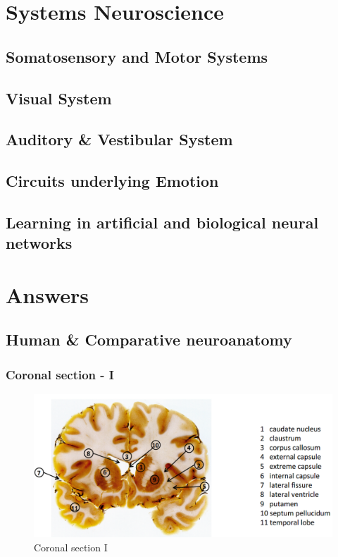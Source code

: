 \documentclass[12pt,article,oneside,a4paper]{memoir}
\begin{document}
\section{Systems Neuroscience}
\subsection{Somatosensory and Motor Systems}
\subsection{Visual System}
\subsection{Auditory \& Vestibular System}
\subsection{Circuits underlying Emotion}
\subsection{Learning in artificial and biological neural networks}

\section{Answers}
\subsection{Human \& Comparative neuroanatomy}

\subsubsection{Coronal section - I}
\begin{figure}[H]
	\centering
  	\includegraphics[width=\linewidth]{imgs/coronal-section-I-answer.png}
	\caption{Coronal section I}
  	\label{fig:coronalSectionI-answer}
\end{figure}
\end{document}
